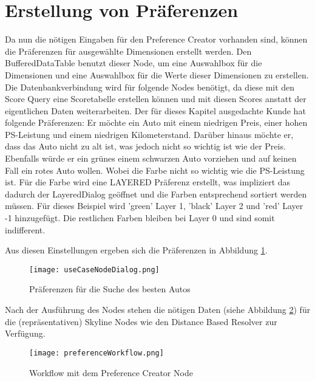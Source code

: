 {\section{Erstellung von Präferenzen}
\label{ch:Evaluierung:sec:createPref}
Da nun die nötigen Eingaben für den Preference Creator vorhanden sind, können die Präferenzen für ausgewählte Dimensionen erstellt werden. Den BufferedDataTable benutzt dieser Node, um eine Auswahlbox für die Dimensionen und eine Auswahlbox für die Werte dieser Dimensionen zu erstellen. Die Datenbankverbindung wird für folgende Nodes benötigt, da diese mit den Score Query eine Scoretabelle erstellen können und mit diesen Scores anstatt der eigentlichen Daten weiterarbeiten. 
Der für dieses Kapitel ausgedachte Kunde hat folgende Präferenzen: Er möchte ein Auto mit einem niedrigen Preis, einer hohen PS-Leistung und einem niedrigen Kilometerstand. Darüber hinaus möchte er, dass das Auto nicht zu alt ist, was jedoch nicht so wichtig ist wie der Preis. Ebenfalls würde er ein grünes einem schwarzen Auto vorziehen und auf keinen Fall ein rotes Auto wollen. Wobei die Farbe nicht so wichtig wie die PS-Leistung ist.  Für die Farbe wird eine LAYERED Präferenz erstellt, was impliziert das dadurch der LayeredDialog geöffnet und die Farben entsprechend sortiert werden müssen. Für dieses Beispiel wird 'green' Layer 1, 'black' Layer 2 und 'red' Layer -1 hinzugefügt. Die restlichen Farben bleiben bei Layer 0 und sind somit indifferent.

Aus diesen Einstellungen ergeben sich die Präferenzen in Abbildung \ref{img:useCaseNodeDialog}. 

\begin{figure}[H]
	\centering
	\texttt{[image: useCaseNodeDialog.png]}
	\caption{Präferenzen für die Suche des besten Autos}
	\label{img:useCaseNodeDialog}
\end{figure} 

Nach der Ausführung des Nodes stehen die nötigen Daten (siehe Abbildung \ref{img:preferenceWorkflow}) für die (repräsentativen) Skyline Nodes wie den Distance Based Resolver zur Verfügung. 

\begin{figure}[H]
	\centering
	\texttt{[image: preferenceWorkflow.png]}
	\caption{Workflow mit dem Preference Creator Node}
	\label{img:preferenceWorkflow}
\end{figure}  
}
